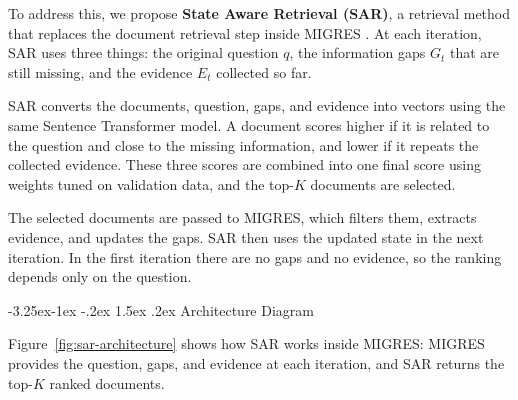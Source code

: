 \documentclass[12pt,a4paper]{report}
\makeatletter
\renewcommand\subsection{\@startsection{subsection}{2}{\z@}%
    {-3.25ex\@plus -1ex \@minus -.2ex}%
    {1.5ex \@plus .2ex}%
    {\normalfont\fontsize{14}{17}\selectfont\bfseries}}
\makeatother
\begin{document}
To address this, we propose \textbf{State Aware Retrieval (SAR)}, a retrieval method that replaces the document retrieval step inside MIGRES \cite{wang2025migres}. At each iteration, SAR uses three things: the original question $q$, the information gaps $G_t$ that are still missing, and the evidence $E_t$ collected so far.

SAR converts the documents, question, gaps, and evidence into vectors using the same Sentence Transformer model. A document scores higher if it is related to the question and close to the missing information, and lower if it repeats the collected evidence. These three scores are combined into one final score using weights tuned on validation data, and the top-$K$ documents are selected.

The selected documents are passed to MIGRES, which filters them, extracts evidence, and updates the gaps. SAR then uses the updated state in the next iteration. In the first iteration there are no gaps and no evidence, so the ranking depends only on the question.

\clearpage

\subsection{Architecture Diagram}

Figure~\ref{fig:sar-architecture} shows how SAR works inside MIGRES: MIGRES provides the question, gaps, and evidence at each iteration, and SAR returns the top-$K$ ranked documents.
\end{document}
